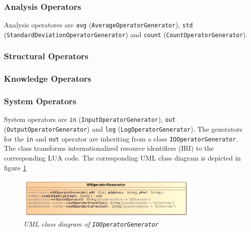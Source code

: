 \subsubsection{Analysis Operators}
Analysis operatores are \texttt{avg} (\texttt{AverageOperatorGenerator}), 
\texttt{std} (\texttt{StandardDeviationOper\-atorGenerator}) and \texttt{count}
(\texttt{CountOperatorGenerator}).

\subsubsection{Structural Operators}

\subsubsection{Knowledge Operators}

\subsubsection{System Operators}
System operators are \texttt{in} (\texttt{InputOperatorGenerator}), 
\texttt{out} (\texttt{OutputOperatorGenerator}) and \texttt{log} 
(\texttt{LogOperatorGenerator}). The generators for the \texttt{in} and 
\texttt{out} operator are inheriting from a class \texttt{IOOperatorGenerator}.
The class transforms internationalized resource identifiers (IRI) to the 
corresponding LUA code. The corresponding UML class diagram is depicted in
figure \ref{fig:iooperatorgenerator} 
\begin{figure}[htpb]
  \centering
  \includegraphics[width=0.8\textwidth]{figures/IOOperatorGenerator}
  \caption{\emph{UML class diagram of \texttt{IOOperatorGenerator}}}
  \label{fig:iooperatorgenerator}
\end{figure}
